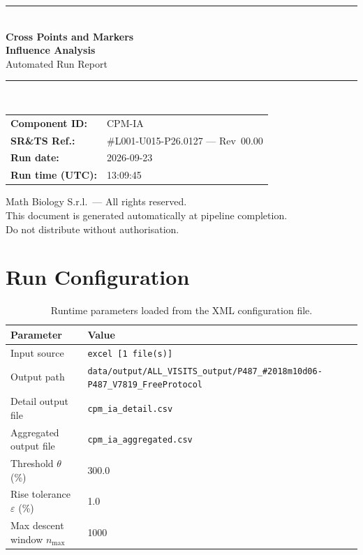\documentclass[a4paper,11pt]{article}
\begin{document}
\begin{titlepage}
\begin{center}
  \vspace*{1.8cm}
  {\color{dmaaccent}\rule{\linewidth}{1.5pt}}\\[0.6cm]
  {\LARGE\bfseries\color{dmaaccent}
    Cross Points and Markers\\[0.25cm]
    Influence Analysis}\\[0.4cm]
  {\Large Automated Run Report}\\[0.3cm]
  {\color{dmaaccent}\rule{\linewidth}{1.5pt}}\\[2cm]

  \begin{tabular}{ll}
    \textbf{Component ID:}   & CPM-IA \\[0.3cm]
    \textbf{SR\&TS Ref.:}    & \#L001-U015-P26.0127 --- Rev~00.00 \\[0.3cm]
    \textbf{Run date:}       & 2026-09-23 \\[0.3cm]
    \textbf{Run time (UTC):} & 13:09:45 \\
  \end{tabular}

  \vfill
  {\color{dmagray}\small
    Math Biology S.r.l.\ --- All rights reserved.\\
    This document is generated automatically at pipeline completion.\\
    Do not distribute without authorisation.}
\end{center}
\end{titlepage}

\tableofcontents
\clearpage

\section{Run Configuration}

\begin{table}[h!]
\centering
\small
\caption{Runtime parameters loaded from the XML configuration file.}
\begin{tabular}{ll}
\toprule
\textbf{Parameter} & \textbf{Value} \\
\midrule
Input source                      & \texttt{excel [1 file(s)]} \\
Output path                       & \texttt{data/output/ALL\_VISITS\_output/P487\_\#2018m10d06-P487\_V7819\_FreeProtocol} \\
Detail output file                & \texttt{cpm\_ia\_detail.csv} \\
Aggregated output file            & \texttt{cpm\_ia\_aggregated.csv} \\
Threshold $\theta$ (\%)           & 300.0 \\
Rise tolerance $\varepsilon$ (\%) & 1.0 \\
Max descent window $n_{\max}$     & 1000 \\
\bottomrule
\end{tabular}
\end{table}
\end{document}
